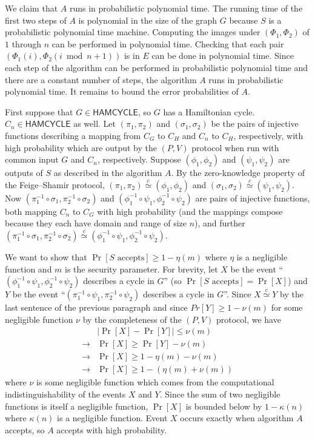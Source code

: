 \documentclass[draft]{article}
\newcommand{\lang}[1]{{\ensuremath{\mathsf{#1}}}}
\newcommand{\cid}{\overset{c}{\simeq}}
\begin{document}
\begin{enumerate}
  We claim that $A$ runs in probabilistic polynomial time.
  The running time of the first two steps of $A$ is polynomial in the size of the graph $G$ because $S$ is a probabilistic polynomial time machine.
  Computing the images under $(\Phi_1, \Phi_2)$ of $1$ through $n$ can be performed in polynomial time.
  Checking that each pair $(\Phi_1(i), \Phi_2(i \bmod{n} + 1))$ is in $E$ can be done in polynomial time.
  Since each step of the algorithm can be performed in probabilistic polynomial time and there are a constant number of steps, the algorithm $A$ runs in probabilistic polynomial time.
  It remains to bound the error probabilities of $A$.

  First suppose that $G\in\lang{HAMCYCLE}$, so $G$ has a Hamiltonian cycle.
  $C_n\in\lang{HAMCYCLE}$ as well.
  Let $(\pi_1, \pi_2)$ and $(\sigma_1, \sigma_2)$ be the pairs of injective functions describing a mapping from $C_G$ to $C_H$ and $C_n$ to $C_H$, respectively, with high probability which are output by the $(P, V)$ protocol when run with common input $G$ and $C_n$, respectively.
  Suppose $(\phi_1, \phi_2)$ and $(\psi_1, \psi_2)$ are outputs of $S$ as described in the algorithm $A$.
  By the zero-knowledge property of the Feige--Shamir protocol, $(\pi_1, \pi_2)\cid (\phi_1, \phi_2)$ and $(\sigma_1, \sigma_2)\cid(\psi_1, \psi_2)$.
  Now $(\pi_1^{-1}\circ\sigma_1, \pi_2^{-1}\circ\sigma_2)$ and $(\phi_1^{-1}\circ\psi_1, \phi_2^{-1}\circ\psi_2)$ are pairs of injective functions, both mapping $C_n$ to $C_G$ with high probability (and the mappings compose because they each have domain and range of size $n$), and further $(\pi_1^{-1}\circ\sigma_1, \pi_2^{-1}\circ\sigma_2) \cid (\phi_1^{-1}\circ\psi_1, \phi_2^{-1}\circ\psi_2)$.

  We want to show that $\Pr[S\text{ accepts}]\geq 1-\eta(m)$ where $\eta$ is a negligible function and $m$ is the security parameter.
  For brevity, let $X$ be the event ``$(\phi_1^{-1}\circ\psi_1, \phi_2^{-1}\circ\psi_2)$ describes a cycle in $G$'' (so $\Pr[S\text{ accepts}]=\Pr[X]$) and $Y$ be the event ``$(\pi_1^{-1}\circ\psi_1, \pi_2^{-1}\circ\psi_2)$ describes a cycle in $G$''.
  Since $X\cid Y$ by the last sentence of the previous paragraph and since $Pr[Y]\geq 1-\nu(m)$ for some negligible function $\nu$ by the completeness of the $(P, V)$ protocol, we have
  \begin{align*}
    & \left|\Pr[X] - \Pr[Y]\right| \leq \nu(m) \\
    \rightarrow & \Pr[X] \geq \Pr[Y] - \nu(m) \\
    \rightarrow & \Pr[X] \geq 1 - \eta(m) - \nu(m) \\
    \rightarrow & \Pr[X] \geq 1 - (\eta(m) + \nu(m))
  \end{align*}
  where $\nu$ is some negligible function which comes from the computational indistinguishability of the events $X$ and $Y$.
  Since the sum of two negligible functions is itself a negligible function, $\Pr[X]$ is bounded below by $1-\kappa(n)$ where $\kappa(n)$ is a negligible function.
  Event $X$ occurs exactly when algorithm $A$ accepts, so $A$ accepts with high probability.


\end{enumerate}
\end{document}
